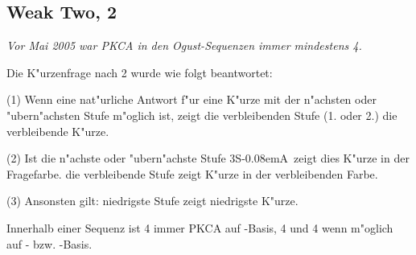 \documentclass[11pt,german,twocolumn,twoside]{scrartcl}
\def\co{\He\xspace}
\def\ka{\Di\xspace}
\def\tr{\Cl\xspace}
\def\sa{\nobreak\textsf{S\kern-0.08emA}\xspace}
\def\pik{\nobreak\hspace{\cardskip}\Sp\xspace}
\def\coe{\nobreak\hspace{\cardskip}\He\xspace}
\def\kar{\nobreak\hspace{\cardskip}\Di\xspace}
\def\tre{\nobreak\hspace{\cardskip}\Cl\xspace}
\def\SA{\nobreak\hspace{\cardskip}\sa}
\begin{document}
\begin{appendix}
\subsection*{Weak Two, 2\coe}

\emph{Vor Mai 2005 war PKCA in den Ogust-Sequenzen immer mindestens 4\tre.}

Die K"urzenfrage nach 2\coe wurde wie folgt beantwortet:

(1) Wenn eine nat"urliche Antwort f"ur eine K"urze mit der n"achsten oder
"ubern"achsten Stufe m"oglich ist, zeigt die verbleibenden Stufe (1. oder 2.)
die verbleibende K"urze.

(2) Ist die n"achste oder "ubern"achste Stufe 3\SA\, zeigt dies K"urze in der
Fragefarbe. die verbleibende Stufe zeigt K"urze in der verbleibenden Farbe.

(3) Ansonsten gilt: niedrigste Stufe zeigt niedrigste K"urze.

Innerhalb einer Sequenz ist 4\pik immer PKCA auf \co-Basis, 4\tre und 4\kar
wenn m"oglich auf \tr- bzw. \ka-Basis.


\end{appendix}
\end{document}
